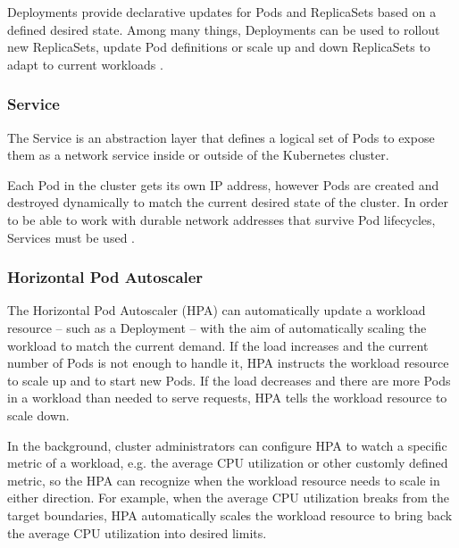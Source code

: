 Deployments provide declarative updates for Pods and ReplicaSets based on a defined desired state. Among many things, Deployments can be used to rollout new ReplicaSets, update Pod definitions or scale up and down ReplicaSets to adapt to current workloads \cite{KubernetesDeployment}.

\subsubsection{Service} \label{k8s-service}

The Service is an abstraction layer that defines a logical set of Pods to expose them as a network service inside or outside of the Kubernetes cluster.

Each Pod in the cluster gets its own IP address, however Pods are created and destroyed dynamically to match the current desired state of the cluster. In order to be able to work with durable network addresses that survive Pod lifecycles, Services must be used \cite{KubernetesService}.


\subsubsection{Horizontal Pod Autoscaler} \label{k8s-hpa}

The Horizontal Pod Autoscaler (HPA) can automatically update a workload resource -- such as a Deployment -- with the aim of automatically scaling the workload to match the current demand. If the load increases and the current number of Pods is not enough to handle it, HPA instructs the workload resource to scale up and to start new Pods. If the load decreases and there are more Pods in a workload than needed to serve requests, HPA tells the workload resource to scale down.

In the background, cluster administrators can configure HPA to watch a specific metric of a workload, e.g. the average CPU utilization or other customly defined metric, so the HPA can recognize when the workload resource needs to scale in either direction. For example, when the average CPU utilization breaks from the target boundaries, HPA automatically scales the workload resource to bring back the average CPU utilization into desired limits.

